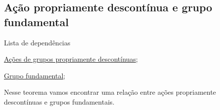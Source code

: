 \subsection{Ação propriamente descontínua e grupo fundamental} %
\label{ações-de-grupos-e-gr-fundamental-prop}
\begin{titlemize}{Lista de dependências}
	\item \hyperref[ações-de-grupo-propriamente-descontínuas-def]{Ações de grupos propriamente descontínuas}; %
	\item \hyperref[grupo-fundamental-def]{Grupo fundamental};\\
\end{titlemize}
Nesse teorema vamos encontrar uma relação entre ações propriamente descontínuas e grupos fundamentais.

